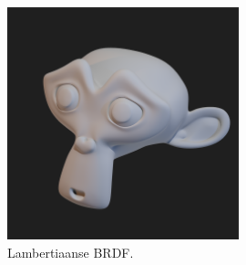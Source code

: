\begin{figure}
  \centering
  \includegraphics[width=0.6\textwidth]{./img/raw/lambert.png}
  \caption{Lambertiaanse BRDF.}
  \label{fig:sh-lambert}
\end{figure}
